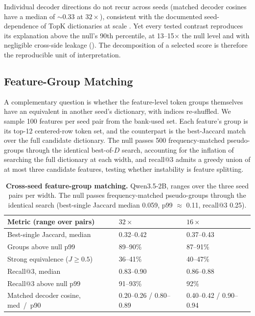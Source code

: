 Individual decoder directions do not recur across seeds (matched decoder cosines
have a median of \(\sim\)0.33 at \(32\times\)), consistent with the documented
seed-dependence of TopK dictionaries at scale
\citep{paulo2025stability}. Yet every tested contrast reproduces its
explanation above the null's 90th percentile, at
13--15\(\times\) the null level and with negligible cross-side
leakage (). The decomposition of a selected
score is therefore the reproducible unit of interpretation.

\subsection{Feature-Group Matching}
\label{app:basis-stability-groups}

A complementary question is whether the feature-level token groups
themselves have an equivalent in another seed's dictionary, with indices
re-shuffled. We sample 100 features
per seed pair from the bank-used set. Each feature's group is its top-12
centered-row token set, and the counterpart is the best-Jaccard match over
the full candidate dictionary. The null passes 500 frequency-matched
pseudo-groups through the identical best-of-\(D\) search, accounting for the
inflation of searching the full dictionary at each width, and recall@3 admits a greedy
union of at most three candidate features, testing whether instability
is feature splitting.

\begin{table}[!tbp]
\caption{\textbf{Cross-seed feature-group matching.} Qwen3.5-2B, ranges
over the three seed pairs per width. The null passes frequency-matched
pseudo-groups through the identical search (best-single Jaccard median
0.059, p99 \(\approx\) 0.11, recall@3 0.25).}
\label{tab:app-feature-group-matching}
\centering
\footnotesize
\setlength{\tabcolsep}{4pt}
\renewcommand{\arraystretch}{1.08}
\begin{tabularx}{\linewidth}{@{}>{\RaggedRight\arraybackslash}p{}ZZ@{}}
\toprule
Metric (range over pairs) & \(32\times\) & \(16\times\) \\
\midrule
Best-single Jaccard, median & 0.32--0.42 & 0.37--0.43 \\
Groups above null p99 & 89--90\% & 87--91\% \\
Strong equivalence (\(J\ge0.5\)) & 36--41\% & 40--47\% \\
Recall@3, median & 0.83--0.90 & 0.86--0.88 \\
Recall@3 above null p99 & 91--93\% & 92\% \\
Matched decoder cosine, \mbox{med / p90} & 0.20--0.26 / 0.80--0.89 & 0.40--0.42 / 0.90--0.94 \\
\bottomrule
\end{tabularx}
\end{table}

